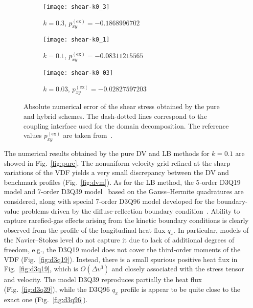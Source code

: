 \documentclass{elsarticle} %
\newcommand{\OO}[1]{O(#1)}
\begin{document}
\begin{figure}
    \centering
    \begin{subfigure}[b]{0.33\textwidth}
        \texttt{[image: shear-k0\_3]}
        \caption{\(k=0.3\), \(p^\mathrm{(ex)}_{xy} = -0.1868996702\)}
        \label{fig:accuracy-k0_3}
    \end{subfigure}%
    \begin{subfigure}[b]{0.33\textwidth}
        \texttt{[image: shear-k0\_1]}
        \caption{\(k=0.1\), \(p^\mathrm{(ex)}_{xy} = -0.08311215565\)}
        \label{fig:accuracy-k0_1}
    \end{subfigure}%
    \begin{subfigure}[b]{0.33\textwidth}
        \texttt{[image: shear-k0\_03]}
        \caption{\(k=0.03\), \(p^\mathrm{(ex)}_{xy} = -0.02827597203\)}
        \label{fig:accuracy-k0_03}
    \end{subfigure}
    \caption{
        Absolute numerical error of the shear stress obtained by the pure and hybrid schemes.
        The dash-dotted lines correspond to the coupling interface used for the domain decomposition.
        The reference values \(p^\mathrm{(ex)}_{xy}\) are taken from~\cite{Luo2016}.
    }\label{fig:accuracy}
\end{figure}

The numerical results obtained by the pure DV and LB methods for \(k=0.1\) are showed in Fig.~\ref{fig:pure}.
The nonuniform velocity grid refined at the sharp variations of the VDF
yields a very small discrepancy between the DV and benchmark profiles (Fig.~\ref{fig:dvm}).
As for the LB method, the 5-order D3Q19 model and 7-order D3Q39 model~\cite{Shan2006}
based on the Gauss--Hermite quadratures are considered, along with special 7-order D3Q96 model
developed for the boundary-value problems driven by the diffuse-reflection boundary condition~\cite{Feuchter2016}.
Ability to capture rarefied-gas effects arising from the kinetic boundary conditions
is clearly observed from the profile of the longitudinal heat flux \(q_x\).
In particular, models of the Navier--Stokes level do not capture it due to lack of additional degrees of freedom,
e.g., the D3Q19 model does not cover the third-order moments of the VDF (Fig.~\ref{fig:d3q19}).
Instead, there is a small spurious positive heat flux in Fig.~\ref{fig:d3q19},
which is \(\OO{\Delta v^3}\) and closely associated with the stress tensor and velocity.
The model D3Q39 reproduces partially the heat flux (Fig.~\ref{fig:d3q39}),
while the D3Q96 \(q_x\) profile is appear to be quite close to the exact one (Fig.~\ref{fig:d3q96}).
\end{document}
